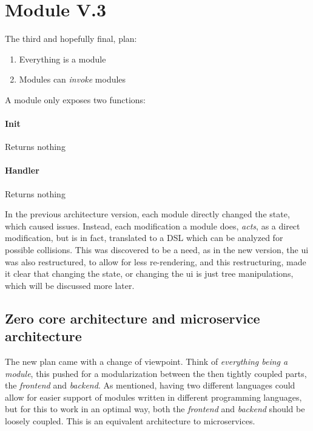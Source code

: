 \section{Module V.3} \label{sec:mod3}

The third and hopefully final, plan:

\begin{enumerate}
  \item Everything is a module
  \item Modules can \textit{invoke} modules
\end{enumerate}

A module only exposes two functions:

\paragraph{Init} Returns nothing

\paragraph{Handler} Returns nothing

In the previous architecture version, each module directly changed the state,
which caused issues. Instead, each modification a module does, \textit{acts}, as
a direct modification, but is in fact, translated to a DSL which can be analyzed
for possible collisions. This was discovered to be a need, as in the new
version, the \gls{ui} was also restructured, to allow for less re-rendering, and
this restructuring, made it clear that changing the state, or changing the
\gls{ui} is just tree manipulations, which will be discussed more later.

\subsection{Zero core architecture and microservice architecture}

The new plan came with a change of viewpoint. Think of
\textit{everything being a module}, this pushed for a modularization between the
then tightly coupled parts, the \textit{frontend} and \textit{backend}. As
mentioned, having two different languages could allow for easier support of
modules written in different programming languages, but for this to work in an
optimal way, both the \textit{frontend} and \textit{backend} should be loosely
coupled. This is an equivalent architecture to microservices.

